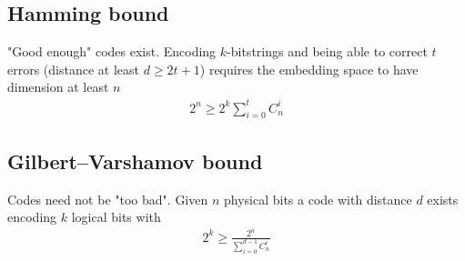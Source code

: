 \documentclass[12 pt]{article}
\begin{document}
\subsection{Hamming bound}
"Good enough" codes exist. Encoding $k$-bitstrings and being able to correct $t$ errors (distance at least $d\ge2t+1$) requires the embedding space to have dimension at least $n$
\begin{align}
2^n\ge 2^k \sum_{i=0}^t C_{n}^i
\end{align}
\subsection{Gilbert–Varshamov bound}
Codes need not be "too bad". Given $n$ physical bits a code  with distance $d$ exists encoding $k$ logical bits with
\begin{align}
2^k\ge \frac{2^n}{\sum_{i=0}^{d-1} C_{n}^i}
\end{align}
\end{document}
